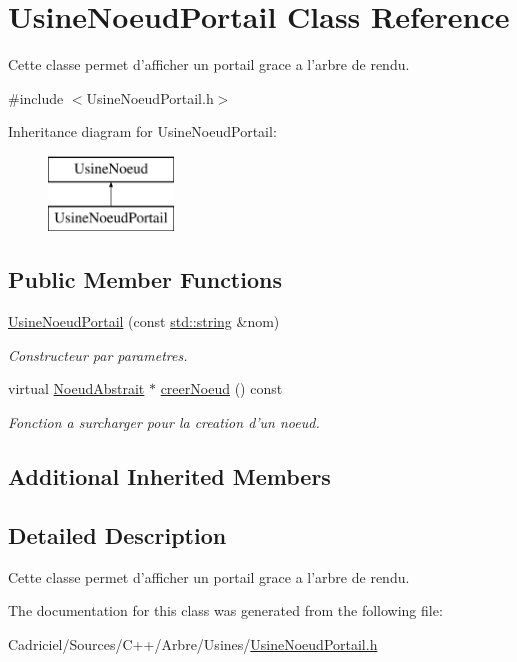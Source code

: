 \hypertarget{class_usine_noeud_portail}{\section{Usine\-Noeud\-Portail Class Reference}
\label{class_usine_noeud_portail}
}


Cette classe permet d'afficher un portail grace a l'arbre de rendu.  




{\ttfamily \#include $<$Usine\-Noeud\-Portail.\-h$>$}

Inheritance diagram for Usine\-Noeud\-Portail\-:\begin{figure}[H]
\begin{center}
\leavevmode
\includegraphics[height=2.000000cm]{class_usine_noeud_portail}
\end{center}
\end{figure}
\subsection*{Public Member Functions}
\begin{DoxyCompactItemize}
\item 
\hyperlink{group__inf2990_ga7d0e963f0f08f6f4544df420b9a747f4}{Usine\-Noeud\-Portail} (const \hyperlink{glew_8h_ae84541b4f3d8e1ea24ec0f466a8c568b}{std\-::string} \&nom)
\begin{DoxyCompactList}\small\item\em Constructeur par parametres. \end{DoxyCompactList}\item 
virtual \hyperlink{class_noeud_abstrait}{Noeud\-Abstrait} $\ast$ \hyperlink{group__inf2990_gaf6eec2bb7996beba8c59cb9720567d55}{creer\-Noeud} () const 
\begin{DoxyCompactList}\small\item\em Fonction a surcharger pour la creation d'un noeud. \end{DoxyCompactList}\end{DoxyCompactItemize}
\subsection*{Additional Inherited Members}


\subsection{Detailed Description}
Cette classe permet d'afficher un portail grace a l'arbre de rendu. 

The documentation for this class was generated from the following file\-:\begin{DoxyCompactItemize}
\item 
Cadriciel/\-Sources/\-C++/\-Arbre/\-Usines/\hyperlink{_usine_noeud_portail_8h}{Usine\-Noeud\-Portail.\-h}\end{DoxyCompactItemize}
